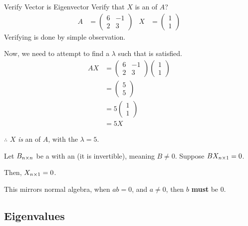 \begin{example}{Verify Vector is Eigenvector}
  Verify that $X$ is an  of $A$?
  \begin{align*}
    A &=
        \begin{pmatrix}
          6 & -1 \\
          2 & 3
        \end{pmatrix} &
                        X &=
                            \begin{pmatrix}
                              1 \\
                              1
                            \end{pmatrix}
  \end{align*}
  \tcblower{}
  Verifying  is done by simple observation.

  Now, we need to attempt to find a $\lambda$ such that  is satisfied.
  \begin{align*}
    AX &=
         \begin{pmatrix}
           6 & -1 \\
           2 & 3
         \end{pmatrix}
               \begin{pmatrix}
                 1 \\
                 1
               \end{pmatrix} \\
    &=
      \begin{pmatrix}
        5 \\
        5
      \end{pmatrix} \\
    &= 5
      \begin{pmatrix}
        1 \\
        1
      \end{pmatrix} \\
    &= 5 X
  \end{align*}

  $\therefore$ $X$ \textit{is} an  of $A$, with the  $\lambda = 5$.
\end{example}

\begin{lemma}\label{lem:Matrix_Multiply_Zero_Vector}
  Let $B_{n \times n}$ be a  with an  (it is invertible), meaning $B \neq 0$.
  Suppose $B X_{n \times 1} = 0$.

  Then, $X_{n \times 1} = 0$.

  \begin{remark*}
    This mirrors normal algebra, when $ab = 0$, and $a \neq 0$, then $b$ \textbf{must} be $0$.
  \end{remark*}
\end{lemma}


\subsection{Eigenvalues}\label{subsec:Eigenvalues}

